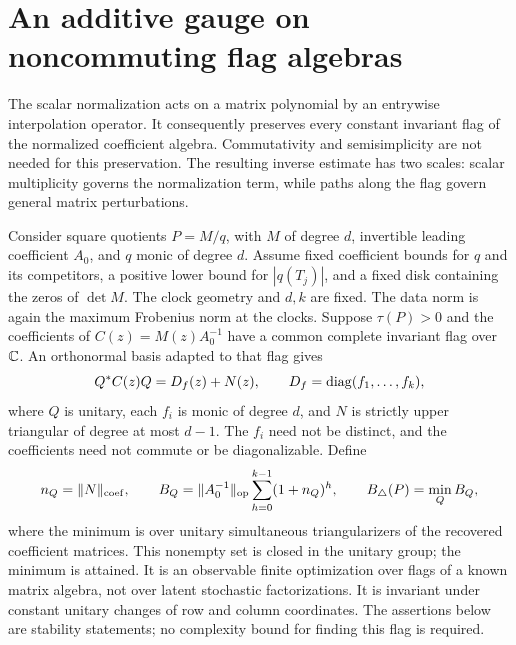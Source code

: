 \section{An additive gauge on noncommuting flag algebras}
\label{sec:flag-gauge}
The scalar normalization acts on a matrix polynomial by an entrywise
interpolation operator. It consequently preserves every constant
invariant flag of the normalized coefficient algebra. Commutativity
and semisimplicity are not needed for this preservation. The resulting
inverse estimate has two scales: scalar multiplicity governs the
normalization term, while paths along the flag govern general matrix
perturbations.

Consider square quotients $P=M/q$, with $M$ of degree $d$, invertible
leading coefficient $A_0$, and $q$ monic of degree $d$. Assume fixed
coefficient bounds for $q$ and its competitors, a positive lower bound
for $|q(T_j)|$, and a fixed disk containing the zeros of $\det M$.
The clock geometry and $d,k$ are fixed. The data norm is again the
maximum Frobenius norm at the clocks. Suppose $\tau(P)>0$ and the
coefficients of $C(z)=M(z)A_0^{-1}$ have a common complete invariant
flag over $\mathbb C$. An orthonormal basis adapted to that flag gives
\begin{equation}\label{eq:flag-triangularization}
 Q^*C(z)Q=D_f(z)+N(z),\qquad D_f=\operatorname{diag}(f_1,\ldots,f_k),
\end{equation}
where $Q$ is unitary, each $f_i$ is monic of degree $d$, and $N$ is
strictly upper triangular of degree at most $d-1$. The $f_i$ need not
be distinct, and the coefficients need not commute or be diagonalizable.
Define
\begin{equation}\label{eq:flag-certificate}
 n_Q=\|N\|_{\rm coef},\qquad
 B_Q=\|A_0^{-1}\|_{\mathrm{op}}\sum_{h=0}^{k-1}(1+n_Q)^h,
 \qquad B_\triangle(P)=\min_Q B_Q,
\end{equation}
where the minimum is over unitary simultaneous triangularizers of the
recovered coefficient matrices. This nonempty set is closed in the
unitary group; the minimum is attained. It is an observable finite
optimization over flags of a known matrix algebra, not over latent
stochastic factorizations. It is invariant under constant unitary
changes of row and column coordinates. The assertions below are
stability statements; no complexity bound for finding this flag is
required.

